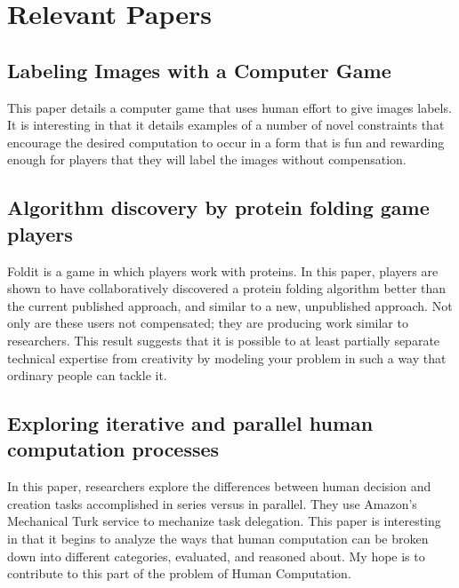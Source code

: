 \documentclass{article}
\begin{document}
\section{Relevant Papers}
\subsection{Labeling Images with a Computer Game}

This paper details a computer game that uses human effort to give images labels\cite{vonAhn:2004:LIC:985692.985733}. It is interesting in that it details examples of a number of novel constraints that encourage the desired computation to occur in a form that is fun and rewarding enough for players that they will label the images without compensation.

\subsection{Algorithm discovery by protein folding game players}
Foldit is a game in which players work with proteins\cite{Khatib22112011}. In this paper, players are shown to have collaboratively discovered a protein folding algorithm better than the current published approach, and similar to a new, unpublished approach. Not only are these users not compensated; they are producing work similar to researchers. This result suggests that it is possible to at least partially separate technical expertise from creativity by modeling your problem in such a way that ordinary people can tackle it. 

\subsection{Exploring iterative and parallel human computation processes}

In this paper, researchers explore the differences between human decision and creation tasks accomplished in series versus in parallel\cite{Little:2010:EIP:1837885.1837907}. They use Amazon's Mechanical Turk service to mechanize task delegation. This paper is interesting in that it begins to analyze the ways that human computation can be broken down into different categories, evaluated, and reasoned about. My hope is to contribute to this part of the problem of Human Computation.




\end{document}
